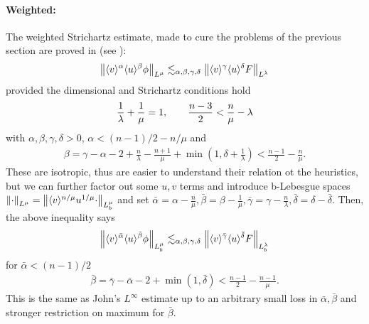 \documentclass[11pt, oneside]{amsart}
\begin{document}
	\paragraph{Weighted:} The weighted Strichartz estimate, made to cure the problems of the previous section are proved in \cite{georgiev_weighted_1997} (see \cite{del_santo_global_1997}):
	\begin{equation*}
		\begin{gathered}
			\left\lVert \langle v \rangle^\alpha\langle u \rangle^\beta\phi\right\rVert_{L^\mu}\lesssim_{\alpha,\beta,\gamma,\delta} \left\lVert \langle v \rangle^\gamma\langle u \rangle^\delta F\right\rVert_{L^\lambda}
		\end{gathered}
	\end{equation*}
	provided the dimensional and Strichartz conditions hold
	\begin{equation*}
		\begin{gathered}
			\frac{1}{\lambda}+\frac{1}{\mu}=1,\qquad \space \frac{n-3}{2}<\frac{n}{\mu}-\lambda
		\end{gathered}
	\end{equation*}
	with $\alpha,\beta,\gamma,\delta>0$, $\alpha<(n-1)/2-n/\mu$ and
	\begin{equation*}
		\begin{gathered}
			\beta=\gamma-\alpha-2+\frac{n}{\lambda}-\frac{n+1}{\mu}+\min(1,\delta+\frac{1}{\lambda})<\frac{n-1}{2}-\frac{n}{\mu}.
		\end{gathered}
	\end{equation*}
	These are isotropic, thus are easier to understand their relation ot the heuristics, but we can further factor out some $u,v$ terms and introduce b-Lebesgue spaces $\left\lVert \cdot\right\rVert_{L^\mu}=\left\lVert \langle v \rangle^{n/\mu}u^{1/\mu}\cdot\right\rVert_{L_b^{\mu}}$ and set $\bar{\alpha}=\alpha-\frac{n}{\mu},\bar{\beta}=\beta-\frac{1}{\mu},\bar{\gamma}=\gamma-\frac{n}{\lambda},\bar{\delta}=\delta-\bar{\delta}$. Then, the above inequality says
	\begin{equation*}
		\begin{gathered}
			\left\lVert \langle v \rangle^{\bar{\alpha}}\langle u \rangle^{\bar{\beta}}\phi\right\rVert_{L^\mu_b}\lesssim_{\alpha,\beta,\gamma,\delta}\left\lVert \langle v \rangle^{\bar{\gamma}}\langle u \rangle^{\bar{\delta}}F\right\rVert_{L^\lambda_b}
		\end{gathered}
	\end{equation*}
	for $\bar{\alpha}<(n-1)/2$
	\begin{equation*}
		\begin{gathered}
			\bar{\beta}=\bar{\gamma}-\bar{\alpha}-2+\min(1,\bar{\delta})<\frac{n-1}{2}-\frac{n-1}{\mu}.
		\end{gathered}
	\end{equation*}
	This is the same as John's $L^\infty$ estimate up to an arbitrary small loss in $\bar{\alpha},\bar{\beta}$ and stronger restriction on maximum for $\bar{\beta}$.
	
\end{document}
